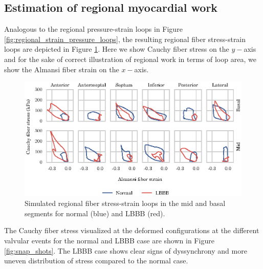 \subsection{Estimation of regional myocardial work}

Analogous to the regional pressure-strain loops in Figure
\ref{fig:regional_strain_pressure_loops}, the resulting regional fiber
stress-strain loops are depicted in Figure
\ref{fig:regional_fiber_stress_strain_loops}. Here we show Cauchy
fiber stress on the $y-$axis and for the sake of correct illustration
of regional work in terms of loop area, we show the Almansi fiber
strain on the $x-$axis. 

\begin{figure}[htbp]
  \centering
  \includegraphics{figures/fiber_stress_strain_loop}
  \caption{\label{fig:regional_fiber_stress_strain_loops}Simulated
    regional fiber stress-strain loops in the mid and basal segments
    for normal (blue) and LBBB (red). } 
\end{figure}

The Cauchy fiber stress visualized at the deformed configurations at
the different valvular events for the normal and LBBB case are shown
in Figure \ref{fig:snap_shots}. The LBBB case shows clear signs of
dyssynchrony and more uneven distribution of stress compared to the
normal case. 

